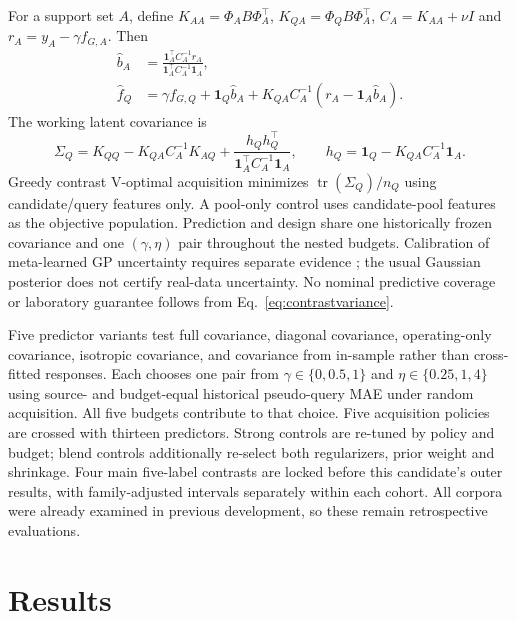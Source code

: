 \documentclass[11pt]{article}
\begin{document}
For a support set $A$, define $K_{AA}=\Phi_A B\Phi_A^\top$, $K_{QA}=\Phi_Q B\Phi_A^\top$, $C_A=K_{AA}+\nu I$ and $r_A=y_A-\gamma f_{G,A}$. Then
\begin{align}
\widehat b_A&=\frac{\mathbf1_A^\top C_A^{-1}r_A}{\mathbf1_A^\top C_A^{-1}\mathbf1_A},\\
\widehat f_Q&=\gamma f_{G,Q}+\mathbf1_Q\widehat b_A+K_{QA}C_A^{-1}(r_A-\mathbf1_A\widehat b_A).
\label{eq:contrastposterior}
\end{align}
The working latent covariance is
\begin{equation}
\Sigma_Q=K_{QQ}-K_{QA}C_A^{-1}K_{AQ}
+\frac{h_Qh_Q^\top}{\mathbf1_A^\top C_A^{-1}\mathbf1_A},\qquad
h_Q=\mathbf1_Q-K_{QA}C_A^{-1}\mathbf1_A.
\label{eq:contrastvariance}
\end{equation}
Greedy contrast V-optimal acquisition minimizes $\operatorname{tr}(\Sigma_Q)/n_Q$ using candidate/query features only. A pool-only control uses candidate-pool features as the objective population. Prediction and design share one historically frozen covariance and one $(\gamma,\eta)$ pair throughout the nested budgets. Calibration of meta-learned GP uncertainty requires separate evidence \cite{iwata}; the usual Gaussian posterior does not certify real-data uncertainty. No nominal predictive coverage or laboratory guarantee follows from Eq.~\ref{eq:contrastvariance}.

Five predictor variants test full covariance, diagonal covariance, operating-only covariance, isotropic covariance, and covariance from in-sample rather than cross-fitted responses. Each chooses one pair from $\gamma\in\{0,0.5,1\}$ and $\eta\in\{0.25,1,4\}$ using source- and budget-equal historical pseudo-query MAE under random acquisition. All five budgets contribute to that choice. Five acquisition policies are crossed with thirteen predictors. Strong controls are re-tuned by policy and budget; blend controls additionally re-select both regularizers, prior weight and shrinkage. Four main five-label contrasts are locked before this candidate's outer results, with family-adjusted intervals separately within each cohort. All corpora were already examined in previous development, so these remain retrospective evaluations.

\section{Results}
\end{document}
